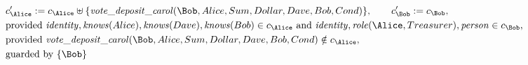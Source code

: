 \begin{align*}
&
c'_
{
\Alice
}
 := 
c_
{
\Alice
}
 \uplus 
\{
\mathit{\detokenize{
vote_deposit_carol
}}
(
\Bob
,
Alice
,
Sum
,
Dollar
,
Dave
,
Bob
,
Cond
)
\}
, \qquad 
c'_
{
\Bob
}
 := 
c_
{
\Bob
}
,\\
&
\text{provided } 
\mathit{\detokenize{
identity
}}
,
\mathit{\detokenize{
knows
}}
(
Alice
)
,
\mathit{\detokenize{
knows
}}
(
Dave
)
,
\mathit{\detokenize{
knows
}}
(
Bob
)
 \in c_
{
\Alice
}
 \text{ and } 
\mathit{\detokenize{
identity
}}
,
\mathit{\detokenize{
role
}}
(
\Alice
,
Treasurer
)
,
\mathit{\detokenize{
person
}}
 \in c_
{
\Bob
}
,\\
&
\text{provided } 
\mathit{\detokenize{
vote_deposit_carol
}}
(
\Bob
,
Alice
,
Sum
,
Dollar
,
Dave
,
Bob
,
Cond
)
 \notin c_
{
\Alice
}
,\\
&
\text{guarded by } \{
\Bob
\}
\end{align*}

